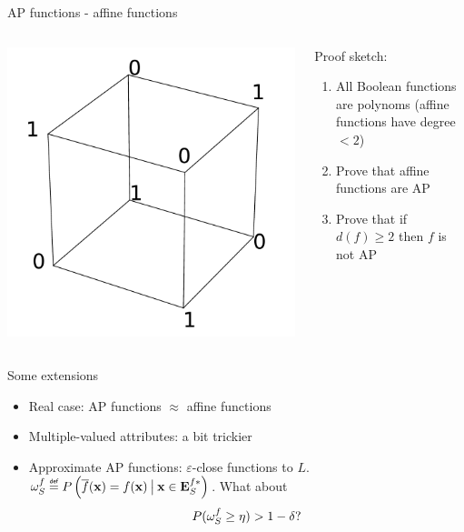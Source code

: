 \documentclass{beamer}
\begin{document}
\begin{frame}{AP functions - affine functions}
  \begin{columns}
    \begin{column}{.5\textwidth}
      \includegraphics[width=.9\textwidth]{figures/affine_functions_neighbors.pdf}
    \end{column}
    \begin{column}{.5\textwidth}
      Proof sketch:
      \begin{enumerate}
        \item All Boolean functions are polynoms (affine functions have degree
          $<2$)
        \item Prove that affine functions are AP
        \item Prove that if $d(f) \geq 2$ then $f$ is not AP
      \end{enumerate}
    \end{column}
  \end{columns}
\end{frame}

\begin{frame}{Some extensions}
  \begin{itemize}
    \item Real case: AP functions $\approx$ affine functions
    \item Multiple-valued attributes: a bit trickier
    \item \alert{Approximate} AP functions: $\varepsilon$-close functions to
      $L$. $\omegasf \eqdef P\left(\albl{\mathbf{x}} = f(\mathbf{x})
      \given[\big] \mathbf{x} \in \esfs\right)$. What about
      $$P(\omega_{S}^{f} \geq \eta) > 1 - \delta \text{?}$$
  \end{itemize}
\end{frame}
\end{document}
